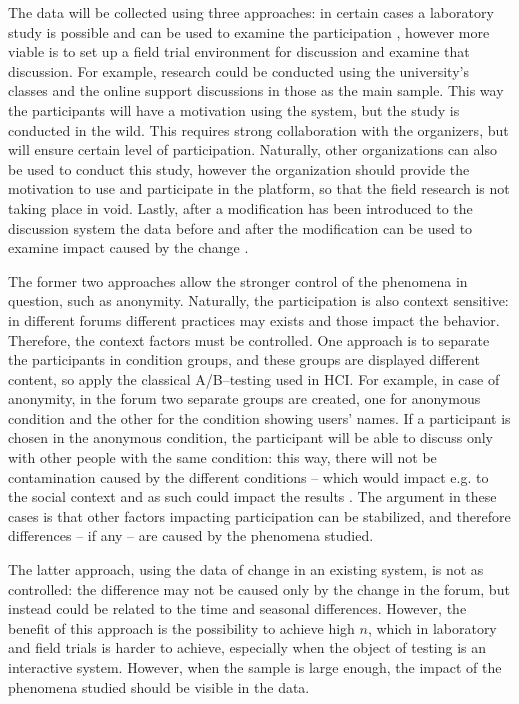 \documentclass{article}
\begin{document}
The data will be collected using three approaches: in certain cases a laboratory study is possible and can be used to examine the participation , however more viable is  to set up a field trial environment for discussion and examine that discussion. For example, research could be conducted using the university's classes and the online support discussions in those as the main sample. This way the participants will have a motivation using the system, but the study is conducted in the wild. This requires strong collaboration with the organizers, but will ensure certain level of participation. Naturally, other organizations can also be used to conduct this study, however the organization should provide the motivation to use and participate in the platform, so that the field research is not taking place in void. Lastly, after a modification has been introduced to the discussion system the data before and after the modification can be used to examine impact caused by the change .

The former two approaches allow the stronger control of the phenomena in question, such as anonymity. Naturally, the participation is also context sensitive: in different forums different practices may exists and those impact the behavior. Therefore, the context factors must be controlled. One approach is to separate the participants in condition groups, and these groups are displayed different content, so apply the classical A/B--testing used in HCI. For example, in case of anonymity, in the forum two separate groups are created, one for anonymous condition and the other for the condition showing users' names. If a participant is chosen in the anonymous condition, the participant will be able to discuss only with other people with the same condition: this way, there will not be contamination caused by the different conditions -- which would impact e.g. to the social context and as such could impact the results \cite{Sukumaran2011}. The argument in these cases is that other factors impacting participation can be stabilized, and therefore differences -- if any -- are caused by the phenomena studied.

The latter approach, using the data of change in an existing system, is not as controlled: the difference may not be caused only by the change in the forum, but instead could be related to the time and seasonal differences. However, the benefit of this approach is the possibility to achieve high $n$, which in laboratory and field trials is harder to achieve, especially when the object of testing is an interactive system. However, when the sample is large enough, the impact of the phenomena studied should be visible in the data.
\end{document}
